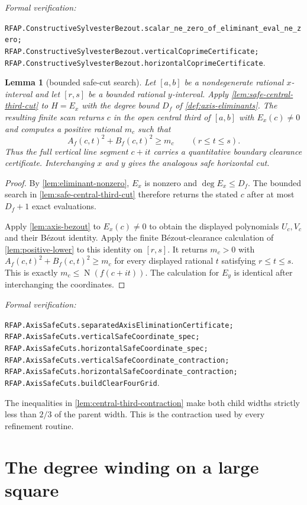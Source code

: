 \documentclass[11pt]{article}
\newtheorem{lemma}[theorem]{Lemma}
\newcommand{\Norm}[1]{\operatorname{N}\!\left(#1\right)}
\newcommand{\leanref}[1]{\par\smallskip\noindent
  \emph{Formal verification:}\par\nobreak
  {\raggedright\nolinkurl{#1}.\par}}
\begin{document}
\leanref{RFAP.ConstructiveSylvesterBezout.scalar_ne_zero_of_eliminant_eval_ne_zero;
RFAP.ConstructiveSylvesterBezout.verticalCoprimeCertificate;
RFAP.ConstructiveSylvesterBezout.horizontalCoprimeCertificate}

\begin{lemma}[bounded safe-cut search]
\label{lem:safe-cut}
Let $[a,b]$ be a nondegenerate rational $x$-interval and let $[r,s]$ be a
bounded rational $y$-interval.  Apply \cref{lem:safe-central-third-cut} to
$H=E_x$ with the degree bound $D_f$ of \cref{def:axis-eliminants}.
The resulting finite scan returns $c$ in the open central third of $[a,b]$
with $E_x(c)\ne0$ and computes a positive rational $m_c$ such that
\[
       A_f(c,t)^2+B_f(c,t)^2\ge m_c
       \qquad(r\le t\le s).
\]
Thus the full vertical line segment $c+it$ carries a quantitative boundary
clearance certificate.  Interchanging $x$ and $y$ gives the analogous safe
horizontal cut.
\end{lemma}

\begin{proof}
By \cref{lem:eliminant-nonzero}, $E_x$ is nonzero and
$\deg E_x\le D_f$.  The bounded search in
\cref{lem:safe-central-third-cut} therefore returns the stated $c$ after at most
$D_f+1$ exact evaluations.

Apply \cref{lem:axis-bezout} to $E_x(c)\ne0$ to obtain the displayed
polynomials $U_c,V_c$ and their Bézout identity.
Apply the finite Bézout-clearance calculation of
\cref{lem:positive-lower} to this identity on $[r,s]$.
It returns $m_c>0$ with
$A_f(c,t)^2+B_f(c,t)^2\ge m_c$ for every displayed rational $t$ satisfying
$r\le t\le s$.  This is exactly $m_c\le\Norm{f(c+it)}$.  The calculation
for $E_y$ is identical after interchanging the coordinates.
\end{proof}

\leanref{RFAP.AxisSafeCuts.separatedAxisEliminationCertificate;
RFAP.AxisSafeCuts.verticalSafeCoordinate_spec;
RFAP.AxisSafeCuts.horizontalSafeCoordinate_spec;
RFAP.AxisSafeCuts.verticalSafeCoordinate_contraction;
RFAP.AxisSafeCuts.horizontalSafeCoordinate_contraction;
RFAP.AxisSafeCuts.buildClearFourGrid}

The inequalities in \cref{lem:central-third-contraction} make both child widths
strictly less than $2/3$ of the parent width.  This is the contraction used
by every refinement routine.

\section{The degree winding on a large square}
\label{sec:global-winding}
\end{document}
